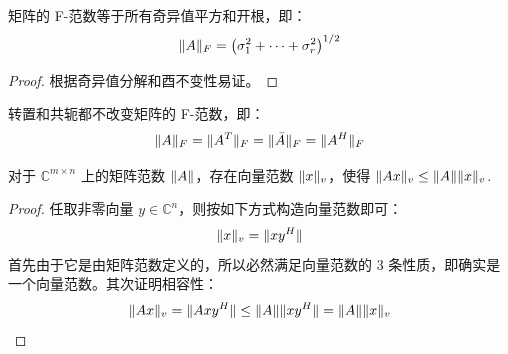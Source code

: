 \begin{corollary}
矩阵的 F-范数等于所有奇异值平方和开根，即：
\[
    \Vert A\Vert_F=\left(\sigma_1^2+\cdots+\sigma_r^2\right)^{1/2}
\]
\end{corollary}
\begin{proof}
根据奇异值分解和酉不变性易证。
\end{proof}

\begin{property}
转置和共轭都不改变矩阵的 F-范数，即：
\[
    \Vert A\Vert_F=\Vert A^T\Vert_F=\Vert\bar A\Vert_F=\Vert A^H\Vert_F
\]
\end{property}

\begin{theorem}
对于 $\mathbb C^{m\times n}$ 上的矩阵范数 $\Vert A\Vert$，存在向量范数 $\Vert x\Vert_v$，使得 $\Vert Ax\Vert_v\leq\Vert A\Vert\Vert x\Vert_v$.
\end{theorem}
\begin{proof}
任取非零向量 $y\in\mathbb C^n$，则按如下方式构造向量范数即可：
\[
    \Vert x\Vert_v=\Vert xy^H\Vert
\]
首先由于它是由矩阵范数定义的，所以必然满足向量范数的 3 条性质，即确实是一个向量范数。其次证明相容性：
\[
    \Vert Ax\Vert_v=\Vert Axy^H\Vert\leq\Vert A\Vert\Vert xy^H\Vert=\Vert A\Vert\Vert x\Vert_v
\]
\end{proof}

